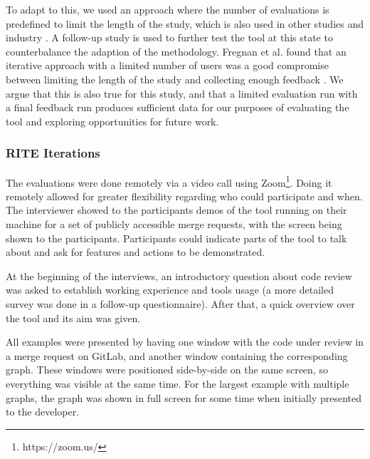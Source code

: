 \documentclass[a4paper,11pt,twoside]{article}
\theoremstyle{definition} %
\renewcommand{\cite}[1]{\citep{#1}}
\begin{document}
To adapt to this, we used an approach where the number of evaluations is predefined to limit the length of the study, which is also used in other studies and industry \citep{10.1145/2858036.2858387, rite-way-to-prototype, really-ingenious-testing-experience}. A follow-up study is used to further test the tool at this state to counterbalance the adaption of the methodology. Fregnan et al. found that an iterative approach with a limited number of users was a good compromise between limiting the length of the study and collecting enough feedback \cite{Fregnan2022}. We argue that this is also true for this study, and that a limited evaluation run with a final feedback run produces sufficient data for our purposes of evaluating the tool and exploring opportunities for future work. 


\subsubsection{RITE Iterations} \label{SubSubSec:RiteIterations}

The evaluations were done remotely via a video call using Zoom\footnote{https://zoom.us/}. Doing it remotely allowed for greater flexibility regarding who could participate and when. The interviewer showed to the participants demos of the tool running on their machine for a set of publicly accessible merge requests, with the screen being shown to the participants. Participants could indicate parts of the tool to talk about and ask for features and actions to be demonstrated. 

At the beginning of the interviews, an introductory question about code review was asked to establish working experience and tools usage (a more detailed survey was done in a follow-up questionnaire). After that, a quick overview over the tool and its aim was given. 

All examples were presented by having one window with the code under review in a merge request on GitLab, and another window containing the corresponding graph. These windows were positioned side-by-side on the same screen, so everything was visible at the same time. For the largest example with multiple graphs, the graph was shown in full screen for some time when initially presented to the developer. 
\end{document}
